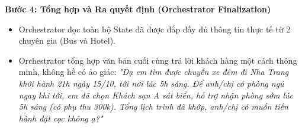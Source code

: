 \textbf{Bước 4: Tổng hợp và Ra quyết định (Orchestrator Finalization)}
\begin{itemize}
    \item Orchestrator đọc toàn bộ State đã được đắp đầy đủ thông tin thực tế từ 2 chuyên gia (Bus và Hotel).
    \item Orchestrator tổng hợp văn bản cuối cùng trả lời khách hàng một cách thông minh, không hề có ảo giác: \textit{"Dạ em tìm được chuyến xe đêm đi Nha Trang khởi hành 21h ngày 15/10, tới nơi lúc 5h sáng. Để anh/chị có phòng ngủ ngay khi tới, em đã chọn Khách sạn A sát biển, hỗ trợ nhận phòng sớm lúc 5h sáng (có phụ thu 300k). Tổng lịch trình đã khớp, anh/chị có muốn tiến hành đặt cọc không ạ?"}
\end{itemize}
